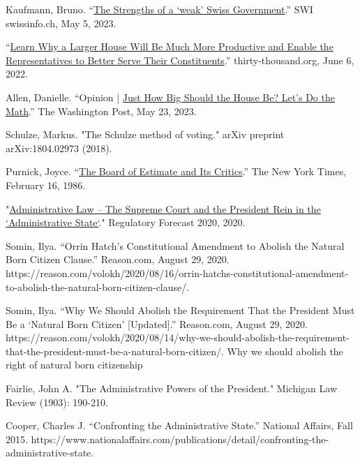 \documentclass{article}
\begin{document}
\begin{thebibliography}{20}
Kaufmann, Bruno. “\href{https://www.swissinfo.ch/eng/business/the-strengths-of-a--weak--swiss-government/48483858. }{The Strengths of a ‘weak’ Swiss Government}.” SWI swissinfo.ch, May 5, 2023. 

“\href{https://thirty-thousand.org/the-house-of-representatives-is-scalable/}{Learn Why a Larger House Will Be Much More Productive and Enable the Representatives to Better Serve Their Constituents}.” thirty-thousand.org, June 6, 2022.

Allen, Danielle. “Opinion | \href{https://www.washingtonpost.com/opinions/2023/03/28/danielle-allen-democracy-reform-house-representatives-districts/}{Just How Big Should the House Be? Let’s Do the Math}.” The Washington Post, May 23, 2023. 

Schulze, Markus. "The Schulze method of voting." arXiv preprint arXiv:1804.02973 (2018).

Purnick, Joyce. “\href{https://www.nytimes.com/1986/02/16/weekinreview/the-board-of-estimate-and-its-critics.html}{The Board of Estimate and Its Critics}.” The New York Times, February 16, 1986.

"\href{https://www.crowell.com/a/web/bomv5ATK9LZPNrBA51skWq/4TtiyY/Regulatory-Forecast-2020-Administrative-Law-Crowell-Moring.pdf. }{Administrative Law – The Supreme Court and the President Rein in the `Administrative State`}." Regulatory Forecast 2020, 2020. 

Somin, Ilya. “Orrin Hatch’s Constitutional Amendment to Abolish the Natural Born Citizen Clause.” Reason.com, August 29, 2020. https://reason.com/volokh/2020/08/16/orrin-hatchs-constitutional-amendment-to-abolish-the-natural-born-citizen-clause/. 

Somin, Ilya. “Why We Should Abolish the Requirement That the President Must Be a ‘Natural Born Citizen’ [Updated].” Reason.com, August 29, 2020. https://reason.com/volokh/2020/08/14/why-we-should-abolish-the-requirement-that-the-president-must-be-a-natural-born-citizen/. 
Why we should abolish the right of natural born citizenship

Fairlie, John A. "The Administrative Powers of the President." Michigan Law Review (1903): 190-210.

Cooper, Charles J. “Confronting the Administrative State.” National Affairs, Fall 2015. https://www.nationalaffairs.com/publications/detail/confronting-the-administrative-state. 


\end{thebibliography}
\end{document}
